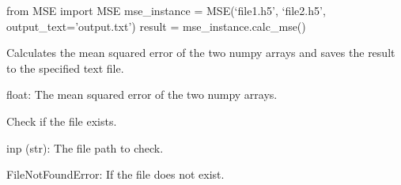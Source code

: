 \documentclass[letterpaper,10pt,english]{sphinxmanual}
\begin{document}
\begin{fulllineitems}
\begin{description}
\begin{description}
\sphinxAtStartPar
from MSE import MSE
mse\_instance = MSE(‘file1.h5’, ‘file2.h5’, output\_text=’output.txt’)
result = mse\_instance.calc\_mse()

\end{description}

\end{description}

\begin{fulllineitems}
\label{\detokenize{cometr.global_metrics:cometr.global_metrics.MSE.MSE.calc_mse}}
\pysigstartsignatures
{}
\pysigstopsignatures
\sphinxAtStartPar
Calculates the mean squared error of the two numpy arrays and saves the result to the specified text file.
\begin{description}
\sphinxAtStartPar
float: The mean squared error of the two numpy arrays.

\end{description}

\end{fulllineitems}


\begin{fulllineitems}
\label{\detokenize{cometr.global_metrics:cometr.global_metrics.MSE.MSE.check_file_exists}}
\pysigstartsignatures
{}
\pysigstopsignatures
\sphinxAtStartPar
Check if the file exists.
\begin{description}
\sphinxAtStartPar
inp (str): The file path to check.

\sphinxAtStartPar
FileNotFoundError: If the file does not exist.

\end{description}

\end{fulllineitems}


\end{fulllineitems}
\end{document}
